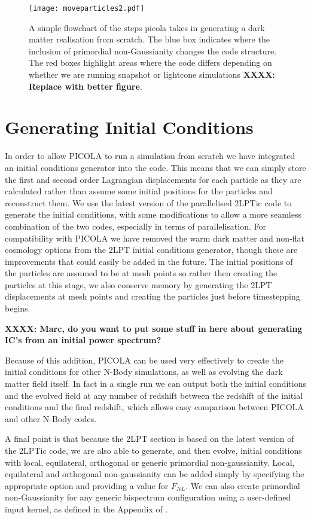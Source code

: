 \documentclass[5p,authoryear]{elsarticle}
\begin{document}
\begin{figure}
\centering
\texttt{[image: moveparticles2.pdf]}
  \caption{A simple flowchart of the steps {\sc picola} takes in generating a dark matter realisation from scratch. The blue box indicates where the inclusion of primordial non-Gaussianity changes the code structure. The red boxes highlight areas where the code differs depending on whether we are running snapshot or lightcone simulations \textbf{XXXX: Replace with better figure}.}
  \label{moveparticles2}
\end{figure}

\section{Generating Initial Conditions}
In order to allow PICOLA to run a simulation from scratch we have integrated an initial conditions generator into the code. This means that we can simply store the first and second order Lagrangian displacements for each particle as they are calculated rather than assume some initial positions for the particles and reconstruct them. We use the latest version of the parallelised 2LPTic code \cite{Scoccimarro2010} to generate the initial conditions, with some modifications to allow a more seamless combination of the two codes, especially in terms of  parallelisation. For compatibility with PICOLA we have removed the warm dark matter and non-flat cosmology options from the 2LPT initial conditions generator, though these are improvements that could easily be added in the future. The initial positions of the particles are assumed to be at mesh points so rather then creating the particles at this stage, we also conserve memory by generating the 2LPT displacements at mesh points and creating the particles just before timestepping begins.

\textbf{XXXX: Marc, do you want to put some stuff in here about generating IC's from an initial power spectrum?}

Because of this addition, PICOLA can be used very effectively to create the initial conditions for other N-Body simulations, as well as evolving the dark matter field itself. In fact in a single run we can output both the initial conditions and the evolved field at any number of redshift between the redshift of the initial conditions and the final redshift, which allows easy comparison between PICOLA and other N-Body codes.

A final point is that because the 2LPT section is based on the latest version of the 2LPTic code, we are also able to generate, and then evolve, initial conditions with local, equilateral, orthogonal or generic primordial non-gaussianity. Local, equilateral and orthogonal non-gaussianity can be added simply by specifying the appropriate option and providing a value for $F_{NL}$. We can also create primordial non-Gaussianity for any generic bispectrum configuration using a user-defined input kernel, as defined in the Appendix of \cite{Scoccimarro2012}.
\end{document}
